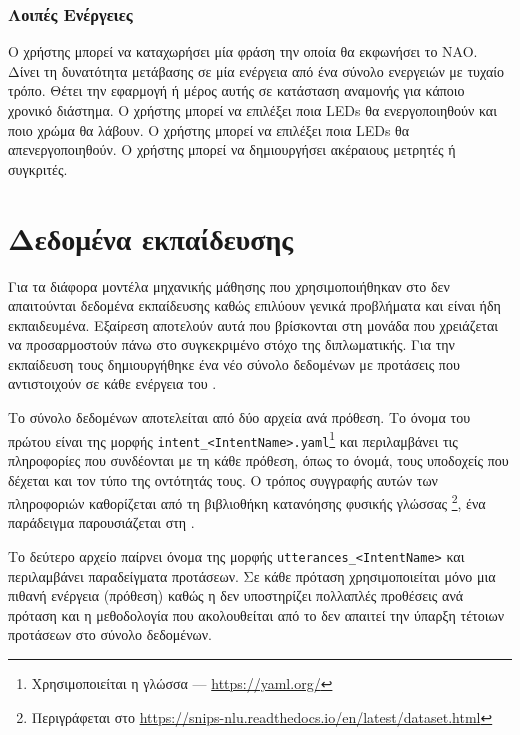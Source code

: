 \subsubsection{Λοιπές Ενέργειες}
\begin{compactitem}
     Ο χρήστης μπορεί να καταχωρήσει μία φράση την οποία θα εκφωνήσει το NAO.
     Δίνει τη δυνατότητα μετάβασης σε μία ενέργεια από ένα σύνολο ενεργειών με τυχαίο τρόπο.
     Θέτει την εφαρμογή ή μέρος αυτής σε κατάσταση αναμονής για κάποιο χρονικό διάστημα.
     Ο χρήστης μπορεί να επιλέξει ποια LEDs θα ενεργοποιηθούν και ποιο χρώμα θα λάβουν.
     Ο χρήστης μπορεί να επιλέξει ποια LEDs θα απενεργοποιηθούν.
     Ο χρήστης μπορεί να δημιουργήσει ακέραιους μετρητές ή συγκριτές.
\end{compactitem}

\section{Δεδομένα εκπαίδευσης}
Για τα διάφορα μοντέλα μηχανικής μάθησης που χρησιμοποιήθηκαν στο \projectname{} δεν απαιτούνται δεδομένα εκπαίδευσης καθώς επιλύουν γενικά προβλήματα και είναι ήδη εκπαιδευμένα.
Εξαίρεση αποτελούν αυτά που βρίσκονται στη μονάδα \NLU{} που χρειάζεται να προσαρμοστούν πάνω στο συγκεκριμένο στόχο της διπλωματικής.
Για την εκπαίδευση τους δημιουργήθηκε ένα νέο σύνολο δεδομένων με προτάσεις που αντιστοιχούν σε κάθε ενέργεια του \metamodel{}.

Το σύνολο δεδομένων αποτελείται από δύο αρχεία ανά πρόθεση.
Το όνομα του πρώτου είναι της μορφής \texttt{intent_<IntentName>.yaml}\footnote{Χρησιμοποιείται η γλώσσα  --- \url{https://yaml.org/}}
και περιλαμβάνει τις πληροφορίες που συνδέονται με τη κάθε πρόθεση, όπως το όνομά, τους υποδοχείς που δέχεται και τον τύπο της οντότητάς τους.
Ο τρόπος συγγραφής αυτών των πληροφοριών καθορίζεται από τη βιβλιοθήκη κατανόησης φυσικής γλώσσας \footnote{Περιγράφεται στο \url{https://snips-nlu.readthedocs.io/en/latest/dataset.html}},
ένα παράδειγμα παρουσιάζεται στη .

Το δεύτερο αρχείο παίρνει όνομα της μορφής \texttt{utterances_<IntentName>} και περιλαμβάνει παραδείγματα προτάσεων.
Σε κάθε πρόταση χρησιμοποιείται μόνο μια πιθανή ενέργεια (πρόθεση) καθώς η  δεν υποστηρίζει πολλαπλές προθέσεις ανά πρόταση και η μεθοδολογία που ακολουθείται από το \projectname{} δεν απαιτεί την ύπαρξη τέτοιων προτάσεων στο σύνολο δεδομένων.

